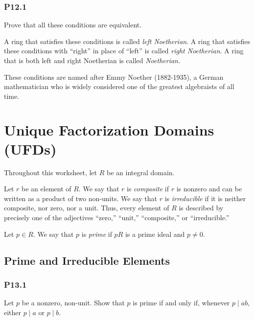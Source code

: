\documentclass[lang=cn,11pt]{template}
\begin{document}
\subsection*{P12.1} Prove that all these conditions are equivalent.

\begin{definition}
A ring that satisfies these conditions is called \textit{left Noetherian}. A ring that satisfies these conditions with “right” in place of “left” is called \textit{right Noetherian}. A ring that is both left and right Noetherian is called \textit{Noetherian}.
\end{definition}

\begin{remark}
These conditions are named after Emmy Noether (1882-1935), a German mathematician who is widely considered one of the greatest algebraists of all time.
\end{remark}







\chapter{Unique Factorization Domains (UFDs)}

Throughout this worksheet, let \( R \) be an integral domain.

\begin{definition}
Let \( r \) be an element of \( R \). We say that \( r \) is \textit{composite} if \( r \) is nonzero and can be written as a product of two non-units. We say that \( r \) is \textit{irreducible} if it is neither composite, nor zero, nor a unit. Thus, every element of \( R \) is described by precisely one of the adjectives “zero,” “unit,” “composite,” or “irreducible.”
\end{definition}

\begin{definition}
Let \( p \in R \). We say that \( p \) is \textit{prime} if \( pR \) is a prime ideal and \( p \neq 0 \).
\end{definition}

\section{Prime and Irreducible Elements}

\subsection*{P13.1} Let \( p \) be a nonzero, non-unit. Show that \( p \) is prime if and only if, whenever \( p \mid ab \), either \( p \mid a \) or \( p \mid b \).
\end{document}
